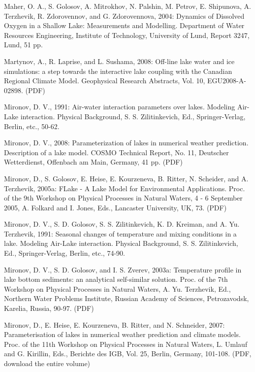 \begin{description}
\item
Maher, O. A., S. Golosov, A. Mitrokhov, N. Palshin, M. Petrov, E. Shipunova, A. Terzhevik, R. Zdorovennov, and G. Zdorovennova, 2004: Dynamics of Dissolved Oxygen in a Shallow Lake: Measurements and Modelling. Department of Water Resources Engineering, Institute of Technology, University of Lund, Report 3247, Lund, 51 pp.
\item
Martynov, A., R. Laprise, and L. Sushama, 2008: Off-line lake water and ice simulations: a step towards the interactive lake coupling with the Canadian Regional Climate Model. Geophysical Research Abstracts, Vol. 10, EGU2008-A-02898. (PDF)
\item
Mironov, D. V., 1991: Air-water interaction parameters over lakes. Modeling Air-Lake interaction. Physical Background, S. S. Zilitinkevich, Ed., Springer-Verlag, Berlin, etc., 50-62.
\item
Mironov, D. V., 2008: Parameterization of lakes in numerical weather prediction. Description of a lake model. COSMO Technical Report, No. 11, Deutscher Wetterdienst, Offenbach am Main, Germany, 41 pp. (PDF)
\item
Mironov, D., S. Golosov, E. Heise, E. Kourzeneva, B. Ritter, N. Scheider, and A. Terzhevik, 2005a: FLake - A Lake Model for Environmental Applications. Proc. of the 9th Workshop on Physical Processes in Natural Waters, 4 - 6 September 2005, A. Folkard and I. Jones, Eds., Lancaster University, UK, 73. (PDF)
\item
Mironov, D. V., S. D. Golosov, S. S. Zilitinkevich, K. D. Kreiman, and A. Yu. Terzhevik, 1991: Seasonal changes of temperature and mixing conditions in a lake. Modeling Air-Lake interaction. Physical Background, S. S. Zilitinkevich, Ed., Springer-Verlag, Berlin, etc., 74-90. 
\item
Mironov, D. V., S. D. Golosov, and I. S. Zverev, 2003a: Temperature profile in lake bottom sediments: an analytical self-similar solution. Proc. of the 7th Workshop on Physical Processes in Natural Waters, A. Yu. Terzhevik, Ed., Northern Water Problems Institute, Russian Academy of Sciences, Petrozavodsk, Karelia, Russia, 90-97. (PDF)
\item
Mironov, D., E. Heise, E. Kourzeneva, B. Ritter, and N. Schneider, 2007: Parameterisation of lakes in numerical weather prediction and climate models. Proc. of the 11th Workshop on Physical Processes in Natural Waters, L. Umlauf and G. Kirillin, Eds., Berichte des IGB, Vol. 25, Berlin, Germany, 101-108. (PDF,  download the entire volume)
\item

\end{description}
